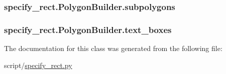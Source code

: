 \subsubsection[{\texorpdfstring{subpolygons}{subpolygons}}]{\setlength{\rightskip}{0pt plus 5cm}specify\+\_\+rect.\+Polygon\+Builder.\+subpolygons}\hypertarget{classspecify__rect_1_1_polygon_builder_a7d0cd051c89820a27adcc6553effd667}{}\label{classspecify__rect_1_1_polygon_builder_a7d0cd051c89820a27adcc6553effd667}
\subsubsection[{\texorpdfstring{text\+\_\+boxes}{text_boxes}}]{\setlength{\rightskip}{0pt plus 5cm}specify\+\_\+rect.\+Polygon\+Builder.\+text\+\_\+boxes}\hypertarget{classspecify__rect_1_1_polygon_builder_a9fd3c4817fb95e2bb1015749a82d4627}{}\label{classspecify__rect_1_1_polygon_builder_a9fd3c4817fb95e2bb1015749a82d4627}


The documentation for this class was generated from the following file\+:\begin{DoxyCompactItemize}
\item 
script/\hyperlink{specify__rect_8py}{specify\+\_\+rect.\+py}\end{DoxyCompactItemize}
